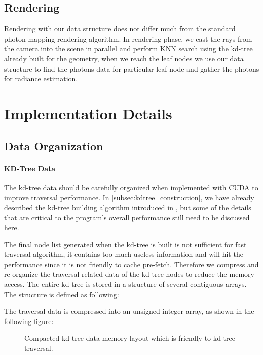 \subsection{Rendering} 

Rendering with our data structure does not differ much from the standard photon mapping rendering algorithm. In rendering phase, we cast the rays from the camera into the scene in parallel and perform KNN search using the kd-tree already built for the geometry, when we reach the leaf nodes we use our data structure to find the photons data for particular leaf node and gather the photons for radiance estimation. 

\section{Implementation Details} 
\label{sec:impl_detials} 

\subsection{Data Organization} 
\label{subsec:data_org}

\paragraph{KD-Tree Data} 

The kd-tree data should be carefully organized when implemented with CUDA to improve traversal performance. In \ref{subsec:kdtree_construction}, we have already described the kd-tree building algorithm introduced in \cite{Zhou2008}, but some of the details that are critical to the program's overall performance still need to be discussed here. 

The final node list generated when the kd-tree is built is not sufficient for fast traversal algorithm, it contains too much useless information and will hit the performance since it is not friendly to cache pre-fetch. Therefore we compress and re-organize the traversal related data of the kd-tree nodes to reduce the memory access. The entire kd-tree is stored in a structure of several contiguous arrays. The structure is defined as following:  

 

The traversal data is compressed into an unsigned integer array, as shown in the following figure: 

\begin{figure}[htp] 
    \centering 
    \renewcommand{\thefigure}{\thechapter.\arabic{figure}}
    \caption[Compacted memory layout of constructed kd-tree data]{Compacted kd-tree data memory layout which is friendly to kd-tree traversal.}
    \label{fig:kdtree_data_memory_layout} 
\end{figure}  

